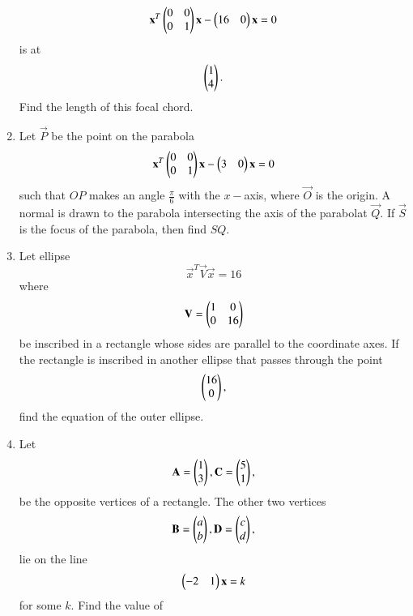 \documentclass[journal,12pt,twocolumn]{IEEEtran}
\begin{document}
\begin{enumerate}[label=\arabic*.]
\begin{equation}
\mathbf{x}^T\begin{pmatrix}0 & 0 \\ 0 & 1\end{pmatrix}\mathbf{x} - \begin{pmatrix}16 & 0\end{pmatrix}\mathbf{x}  =0
\end{equation}
%
is at 
\begin{equation}
\begin{pmatrix} 1 \\ 4 \end{pmatrix}.
\end{equation}
%
Find the length of this focal chord.
\item Let $\vec{P}$ be the point on the parabola 
\begin{equation}
\mathbf{x}^T\begin{pmatrix}0 & 0 \\ 0 & 1\end{pmatrix}\mathbf{x} - \begin{pmatrix}3 & 0\end{pmatrix}\mathbf{x}  =0
\end{equation}
%
such that $OP$ makes an angle $\frac{\pi}{6}$ with the $x-$axis, where $\vec{O}$ is the origin. A normal is drawn to the parabola intersecting the axis of the parabolat $\vec{Q}$.  If $\vec{S}$ is the focus of the parabola, then find $SQ$.
\item Let ellipse 
\begin{equation}
\vec{x}^T\vec{V}\vec{x} =16
\end{equation}
%
where
\begin{equation}
\mathbf{V} = \begin{pmatrix}1 & 0 \\ 0 & 16\end{pmatrix}
\end{equation}
%
be inscribed in a rectangle whose sides are parallel to the coordinate axes.  If the rectangle is inscribed in another ellipse that passes through the point 
\begin{equation}
\begin{pmatrix} 16 \\ 0 \end{pmatrix},
\end{equation}
%
find the equation of the outer ellipse.
\item Let 
\begin{equation}
\mathbf{A}=\begin{pmatrix}1 \\ 3 \end{pmatrix},
\mathbf{C}=\begin{pmatrix}5 \\ 1 \end{pmatrix},
\end{equation}
be the opposite vertices of a rectangle.  The other two vertices
\begin{equation}
\mathbf{B}=\begin{pmatrix}a \\ b \end{pmatrix},
\mathbf{D}=\begin{pmatrix}c \\ d \end{pmatrix},
\end{equation}
%
lie on the line 
\begin{equation}
\begin{pmatrix}-2 & 1 \end{pmatrix}\mathbf{x}  =k
\end{equation}
%
for some $k$.  Find the value of 
\begin{equation}

\end{equation}
\end{enumerate}
\end{document}

